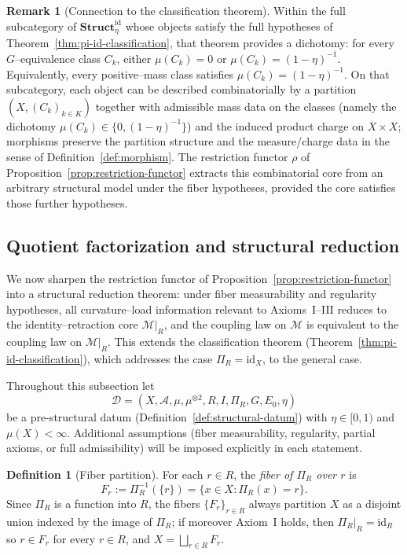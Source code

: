 \documentclass[11pt]{article}
\numberwithin{equation}{section}
\theoremstyle{definition}
\newtheorem{definition}[theorem]{Definition}
\newtheorem{remark}[theorem]{Remark}
\begin{document}
\begin{remark}[Connection to the classification theorem]\label{rem:category-classification}
\sloppy
Within the full subcategory of $\mathbf{Struct}^{\mathrm{id}}_{\eta}$ whose objects satisfy the full hypotheses of Theorem~\ref{thm:pi-id-classification}, that theorem provides a dichotomy: for every $G$--equivalence class $C_k$, either $\mu(C_k)=0$ or $\mu(C_k)=(1-\eta)^{-1}$. Equivalently, every positive--mass class satisfies $\mu(C_k)=(1-\eta)^{-1}$. On that subcategory, each object can be described combinatorially by a partition $(X,(C_k)_{k\in K})$ together with admissible mass data on the classes (namely the dichotomy $\mu(C_k)\in\{0,(1-\eta)^{-1}\}$) and the induced product charge on $X\times X$; morphisms preserve the partition structure and the measure/charge data in the sense of Definition~\ref{def:morphism}. The restriction functor $\rho$ of Proposition~\ref{prop:restriction-functor} extracts this combinatorial core from an arbitrary structural model under the fiber hypotheses, provided the core satisfies those further hypotheses.
\end{remark}

\subsection{Quotient factorization and structural reduction}\label{sec:quotient-factorization}

We now sharpen the restriction functor of Proposition~\ref{prop:restriction-functor} into a structural reduction theorem: under fiber measurability and regularity hypotheses, all curvature--load information relevant to Axioms~I--III reduces to the identity--retraction core $\mathcal M|_R$, and the coupling law on $\mathcal M$ is equivalent to the coupling law on $\mathcal M|_R$. This extends the classification theorem (Theorem~\ref{thm:pi-id-classification}), which addresses the case $\Pi_R=\mathrm{id}_X$, to the general case.

Throughout this subsection let
\[
\mathcal D=(X,\mathcal A,\mu,\mu^{\otimes2},R,I,\Pi_R,G,E_0,\eta)
\]
be a pre-structural datum (Definition~\ref{def:structural-datum}) with $\eta\in[0,1)$ and $\mu(X)<\infty$. Additional assumptions (fiber measurability, regularity, partial axioms, or full admissibility) will be imposed explicitly in each statement.

\begin{definition}[Fiber partition]\label{def:fibers}
For each $r\in R$, the \emph{fiber of $\Pi_R$ over $r$} is
\[
F_r:=\Pi_R^{-1}(\{r\})=\{x\in X:\Pi_R(x)=r\}.
\]
Since $\Pi_R$ is a function into $R$, the fibers $\{F_r\}_{r\in R}$ always partition $X$ as a disjoint union indexed by the image of $\Pi_R$; if moreover Axiom~I holds, then $\Pi_R|_R=\mathrm{id}_R$ so $r\in F_r$ for every $r\in R$, and $X=\bigsqcup_{r\in R}F_r$.
\end{definition}
\end{document}
